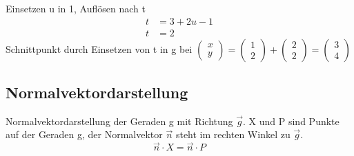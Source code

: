 \documentclass[a4paper]{article}
\begin{document}
Einsetzen u in \textcircled{\footnotesize{1}}, Auflösen nach t
\begin{align*}
t&=3+2u-1\\
t&=2
\end{align*}
Schnittpunkt durch Einsetzen von t in g bei $\begin{pmatrix}x\\y\end{pmatrix}=\begin{pmatrix}1\\2\end{pmatrix}+\begin{pmatrix}2\\2\end{pmatrix}=\begin{pmatrix}3\\4\end{pmatrix}$


\subsection{Normalvektordarstellung}
Normalvektordarstellung der Geraden g mit Richtung $\vec g$. X und P sind Punkte auf der Geraden g, der Normalvektor $\vec n$ steht im rechten Winkel zu $\vec g$.
\[
\vec n \cdot X = \vec n \cdot P
\]
\end{document}
